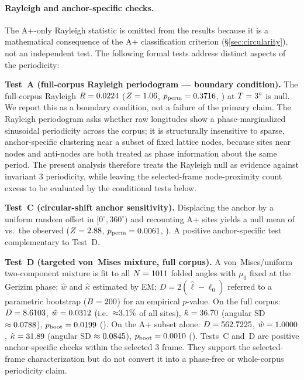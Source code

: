 \paragraph*{Rayleigh and anchor-specific checks.}
\label{sec:results_rayleigh}
The A+-only Rayleigh statistic is omitted from the results because it is a
mathematical consequence of the A+ classification criterion
(\S\ref{sec:circularity}), not an independent test.
The following formal tests address distinct aspects of the periodicity:

\textbf{Test~A (full-corpus Rayleigh periodogram — boundary condition).}
The full-corpus Rayleigh $R = 0.0224$
($Z = 1.06$, $p_\mathrm{perm} = 0.3716$,
\fullRayleighPermPSig{}) at $T = 3\textdegree{}$ is null.
We report this as a boundary condition, not a failure of the
primary claim. The Rayleigh periodogram asks whether raw longitudes
show a phase-marginalized sinusoidal periodicity across the corpus; it
is structurally insensitive to sparse, anchor-specific clustering near
a subset of fixed lattice nodes, because sites near nodes and
anti-nodes are both treated as phase information about the same period.
The present analysis therefore treats the Rayleigh null as evidence
against invariant 3\textdegree{} periodicity, while leaving the
selected-frame node-proximity count excess to be evaluated by the
conditional tests below.

\textbf{Test~C (circular-shift anchor sensitivity).}
Displacing the anchor by a uniform random offset in $[0^\circ,
360^\circ)$ and recounting A+ sites yields a null mean of
\anchorShiftNullMu{} vs.\ the observed \anchorShiftApCount{}
($Z = 2.88$, $p_\mathrm{perm} = 0.0061$, \anchorShiftPermPSig{}).
A positive anchor-specific test complementary to Test~D.

\textbf{Test~D (targeted von~Mises mixture, full corpus).}
A von~Mises/uniform two-component mixture is fit to all $N = 1011$
folded angles with $\mu_0$ fixed at the Gerizim phase; $\hat{w}$ and
$\hat{\kappa}$ estimated by EM; $D = 2(\hat{\ell} - \ell_0)$ referred to a
parametric bootstrap ($B = 200$) for an empirical $p$-value.
On the full corpus: $D = 8.6103$,
$\hat{w} = 0.0312$ (i.e.\ ${\approx}3.1\%$ of all
sites), $\hat{\kappa} = 36.70$
(angular SD $\approx 0.0788$\textdegree{}),
$p_\mathrm{boot} = 0.0199$ (\targetedPfullSig{}).
On the A+ subset alone: $D = 562.7225$, $\hat{w} = 1.0000$,
$\hat{\kappa} = 31.89$ (angular SD $\approx 0.0845$\textdegree{}),
$p_\mathrm{boot} = 0.0010$ (\targetedPApSig{}).
Tests~C and~D are positive anchor-specific checks within the selected
3\textdegree{} frame. They support the selected-frame characterization
but do not convert it into a phase-free or whole-corpus periodicity
claim.

